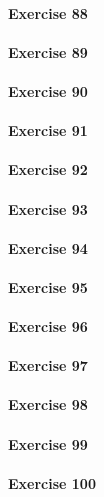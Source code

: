 \paragraph{Exercise 88}
\paragraph{Exercise 89}
\paragraph{Exercise 90}
\paragraph{Exercise 91}
\paragraph{Exercise 92}
\paragraph{Exercise 93}
\paragraph{Exercise 94}
\paragraph{Exercise 95}
\paragraph{Exercise 96}
\paragraph{Exercise 97}
\paragraph{Exercise 98}
\paragraph{Exercise 99}
\paragraph{Exercise 100}